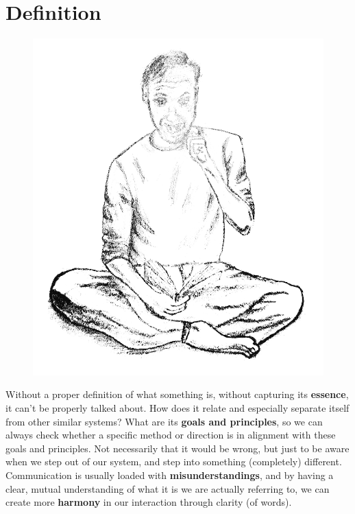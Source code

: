 \chapter{Definition}\label{ch:definition}

\begin{figure}[h]
	\begin{center}
	{\includegraphics[width=0.3\paperwidth]{images/testpic}}
	\end{center}\label{img:definition}
\end{figure}

Without a proper definition of what something is, without capturing its \textbf{essence}, it can't be properly talked about.
How does it relate and especially separate itself from other similar systems?
What are its \textbf{goals and principles}, so we can always check whether a specific method or direction is in alignment with these goals and principles.
Not necessarily that it would be wrong, but just to be aware when we step out of our system, and step into something (completely) different.
Communication is usually loaded with \textbf{misunderstandings}, and by having a clear, mutual understanding of what it is we are actually referring to, we can create more \textbf{harmony} in our interaction through clarity (of words).

